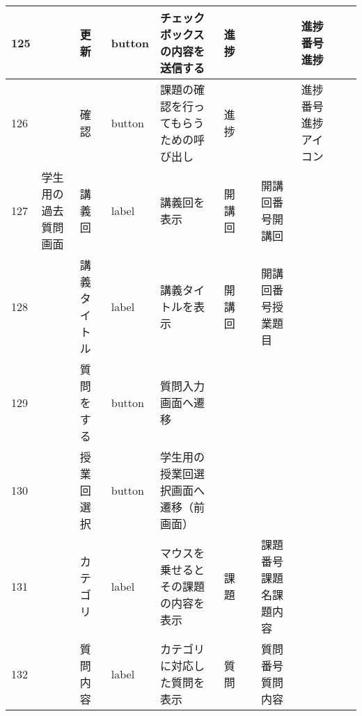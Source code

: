 \begin{table}[]
\begin{tabular}{|l|l|l|l|l|l|l|l|l|l|l|}
125 &               & 更新               & button   & チェックボックスの内容を送信する                                                  & 進捗      &                       &                    & 進捗番号進捗          &                               &                                                                \\ \hline
126 &               & 確認               & button   & 課題の確認を行ってもらうための呼び出し                                               & 進捗      &                       &                    & 進捗番号進捗アイコン      &                               &                                                                \\ \hline
127 & 学生用の過去質問画面    & 講義回              & label    & 講義回を表示                                                            & 開講回     &                       & 開講回番号開講回           &                 &                               &                                                                \\ \hline
128 &               & 講義タイトル           & label    & 講義タイトルを表示                                                         & 開講回     &                       & 開講回番号授業題目          &                 &                               &                                                                \\ \hline
129 &               & 質問をする            & button   & 質問入力画面へ遷移                                                         &         &                       &                    &                 &                               &                                                                \\ \hline
130 &               & 授業回選択            & button   & 学生用の授業回選択画面へ遷移（前画面）                                               &         &                       &                    &                 &                               &                                                                \\ \hline
131 &               & カテゴリ             & label    & マウスを乗せるとその課題の内容を表示                                                & 課題      &                       & 課題番号課題名課題内容        &                 &                               &                                                                \\ \hline
132 &               & 質問内容             & label    & カテゴリに対応した質問を表示                                                    & 質問      &                       & 質問番号質問内容           &                 &                               &                                                                \\ \hline

\end{tabular}
\end{table}
